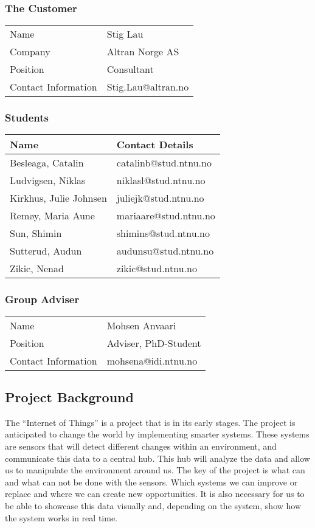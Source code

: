 \documentclass[../document.tex]{subfiles}
\begin{document}
\subsubsection{The Customer}
\begin{tabular}{ll}
\hline
Name					&	Stig Lau\\
Company				&	Altran Norge AS\\
Position				&	Consultant\\
Contact Information		&	Stig.Lau@altran.no\\
\hline
\end{tabular}

\subsubsection{Students}
\begin{tabular}{ll}
\hline
Name				&	Contact Details\\ \hline
Besleaga, Catalin		&	catalinb@stud.ntnu.no\\
Ludvigsen, Niklas		&	niklasl@stud.ntnu.no\\
Kirkhus, Julie Johnsen	&	juliejk@stud.ntnu.no\\
Remøy, Maria Aune		&	mariaare@stud.ntnu.no\\
Sun, Shimin			&	shimins@stud.ntnu.no\\
Sutterud, Audun		&	audunsu@stud.ntnu.no\\
Zikic, Nenad			&	zikic@stud.ntnu.no\\
\hline
\end{tabular}

\subsubsection{Group Adviser}
\begin{tabular}{ll}
\hline
Name				&	Mohsen Anvaari\\
Position			&	Adviser, PhD-Student\\
Contact Information	&	mohsena@idi.ntnu.no\\
\hline
\end{tabular}

\subsection{Project Background}
The “Internet of Things” is a project that is in its early stages. The project is anticipated to change the world by implementing smarter systems. These systems are sensors that will detect different changes within an environment, and communicate this data to a central hub. This hub will analyze the data and allow us to manipulate the environment around us. The key of the project is what can and what can not be done with the sensors. Which systems we can improve or replace and where we can create new opportunities. It is also necessary for us to be able to showcase this data visually and, depending on the system, show how the system works in real time.
\end{document}
